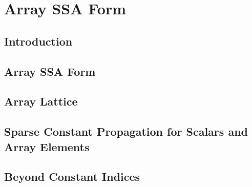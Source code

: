 \chapter{Array SSA Form }
\graphicspath{{part2/array_ssa/Figs/}{array_ssa/Figs/}{Figs/}}
\def\REM{REM:}
\newenvironment{programa}{\begin{minipage}{0.6\textwidth}
}{%
\end{minipage}}
\def\Ta{\hspace{1em}}
\def\Tb{\hspace{2em}}
\def\Tc{\hspace{3em}}
\def\Td{\hspace{4em}}
\def\Te{\hspace{5em}}
\def\False{\textsf{False}}
\def\True{\textsf{True}}
\def\Set{\textsf{Set}}
\def\U{U}
\def\URS{URS}
\def\DRS{DRS}
\def\DDS{DDS}
\def\DDRS{DDRS}
\def\DEAD{DEAD}
\def\KILL{KILL}
\def\LIVE{LIVE}
\def\imp{imp}
\def\DS{DS}
\def\ds{ds}
\def\DD{DD}
\def\dd{dd}
\def\viz{viz}
\def\Update{Update}
\def\Valnum{Valnum}
\def\No{No}
\def\Maybe{Maybe}
\def\Must{Must}
\def\Yes{Yes}
\def\X{X}
\def\T{T}
\def\F{F}
\def\L{L}
\def\H{H}
\def\V{V}
\def\HA{HA}
\def\Hb{Hb}
\def\Hc{Hc}
\def\Hd{Hd}
\def\Hf{Hf}
\def\Hi{Hi}
\def\Hl{Hl}
\def\HO{HO}
\def\At{At}
\def\jp{jp}
\def\joc{joc}

\section{Introduction}
\label{sec:intro}

\section{Array SSA Form}
\label{sec:arrayssa}

\section{Array Lattice}
\label{sec:arraylattice}

\section{Sparse Constant Propagation for Scalars and Array Elements}
\label{sec:sc}

\section{Beyond Constant Indices}
\label{sec:non-const}


